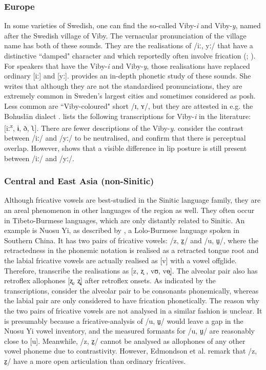\documentclass[output=paper,colorlinks,citecolor=brown,chinesefont]{langscibook}
\begin{document}
\subsubsection{Europe}
In some varieties of Swedish, one can find the so-called Viby-\textit{i} and Viby-\textit{y}, named after the Swedish village of Viby. The vernacular pronunciation of the village name has both of these sounds. They are the realisations of /iː, yː/ that have a distinctive ``damped" character and which reportedly often involve frication (\cite{Björsten&Engstrand_1999}; \cite{Grönberg_2004}). For speakers that have the Viby-\textit{i} and Viby-\textit{y}, those realisations have replaced ordinary [iː] and [yː]. \citet{westerberg_2020} provides an in-depth phonetic study of these sounds. She writes that although they are not the standardised pronunciations, they are extremely common in Sweden's largest cities and sometimes considered as posh. Less common are ``Viby-coloured" short /ɪ, ʏ/, but they are attested in e.g. the Bohuslän dialect \citep[70]{westerberg_2020}. \citet[53]{westerberg_2020} lists the following transcriptions for Viby-\textit{i} in the literature: [iː\textsuperscript{z}, ɨ, ð, ʅ]. There are fewer descriptions of the Viby-\textit{y}. \citet{Björsten&Engstrand_1999} consider the contrast between /iː/ and /yː/ to be neutralised, and \citet{Gross&Forsberg_2020} confirm that there is perceptual overlap. However, \citet[194]{westerberg_2020} shows that a visible difference in lip posture is still present between /iː/ and /yː/.

\subsubsection{Central and East Asia (non-Sinitic)}
Although fricative vowels are best-studied in the Sinitic language family, they are an areal phenomenon in other languages of the region as well. They often occur in Tibeto-Burmese languages, which are only distantly related to Sinitic. An example is Nuosu Yi, as described by \citet{Edmondson&al_2017}, a Lolo-Burmese language spoken in Southern China. It has two pairs of fricative vowels: /z, z̠/ and /u, u̠/, where the retractedness in the phonemic notation is realised as a retracted tongue root and the labial fricative vowels are actually realised as [v] with a vowel offglide. Therefore, \citet{Edmondson&al_2017} transcribe the realisations as [z, z̙ , vʊ, vɵ̙]. The alveolar pair also has retroflex allophones [ʐ, ʐ̙] after retroflex onsets. As indicated by the transcriptions, \citet{Edmondson&al_2017} consider the alveolar pair to be consonants phonemically, whereas the labial pair are only considered to have frication phonetically. The reason why the two pairs of fricative vowels are not analysed in a similar fashion is unclear. It is presumably because a fricative-analysis of /u, u̠/ would leave a gap in the Nuosu Yi vowel inventory, and the measured formants for /u, u̠/ are reasonably close to [u]. Meanwhile, /z, z̠/ cannot be analysed as allophones of any other vowel phoneme due to contrastivity. However, Edmondson et al. remark that /z, z̠/ have a more open articulation than ordinary fricatives.
\end{document}
